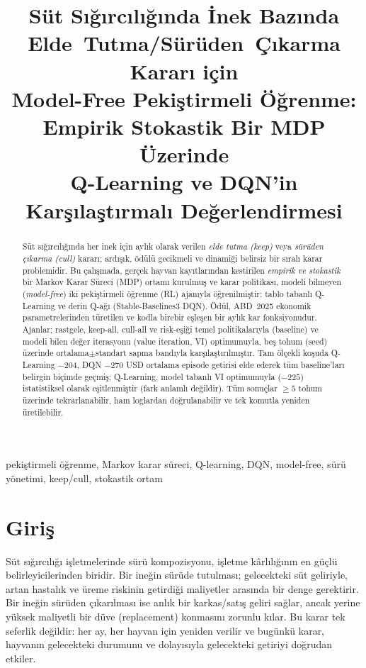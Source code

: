 \documentclass[conference]{IEEEtran}
\title{Süt Sığırcılığında İnek Bazında Elde~Tutma/Sürüden~Çıkarma Kararı için \\ Model-Free Pekiştirmeli Öğrenme: Empirik Stokastik Bir MDP Üzerinde \\ Q-Learning ve DQN'in Karşılaştırmalı Değerlendirmesi}
\author{
\IEEEauthorblockN{Artun Kara (255172008)}
\IEEEauthorblockA{Bilişim Sistemleri Mühendisliği\\ Kocaeli, Türkiye\\ artunankara@gmail.com}
}
\begin{document}
\maketitle

\begin{abstract}
Süt sığırcılığında her inek için aylık olarak verilen \emph{elde tutma (keep)} veya
\emph{sürüden çıkarma (cull)} kararı; ardışık, ödülü gecikmeli ve dinamiği belirsiz
bir sıralı karar problemidir. Bu çalışmada, gerçek hayvan kayıtlarından kestirilen
\emph{empirik ve stokastik} bir Markov Karar Süreci (MDP) ortamı kurulmuş ve karar
politikası, modeli bilmeyen (\emph{model-free}) iki pekiştirmeli öğrenme (RL) ajanıyla
öğrenilmiştir: tablo tabanlı Q-Learning ve derin Q-ağı (Stable-Baselines3 DQN). Ödül,
ABD~2025 ekonomik parametrelerinden türetilen ve kodla birebir eşleşen bir aylık kar
fonksiyonudur. Ajanlar; rastgele, keep-all, cull-all ve risk-eşiği temel
politikalarıyla (baseline) ve modeli bilen değer iterasyonu (value iteration, VI)
optimumuyla, beş tohum (seed) üzerinde ortalama$\pm$standart sapma bandıyla
karşılaştırılmıştır. Tam ölçekli koşuda Q-Learning $-204$, DQN $-270$ USD ortalama
episode getirisi elde ederek tüm baseline'ları belirgin biçimde geçmiş; Q-Learning,
model tabanlı VI optimumuyla ($-225$) istatistiksel olarak eşitlenmiştir (fark anlamlı değildir).
Tüm sonuçlar $\geq5$ tohum üzerinde tekrarlanabilir, ham loglardan doğrulanabilir ve
tek komutla yeniden üretilebilir.
\end{abstract}

\begin{IEEEkeywords}
pekiştirmeli öğrenme, Markov karar süreci, Q-learning, DQN, model-free,
sürü yönetimi, keep/cull, stokastik ortam
\end{IEEEkeywords}

\section{Giriş}
Süt sığırcılığı işletmelerinde sürü kompozisyonu, işletme kârlılığının en güçlü
belirleyicilerinden biridir. Bir ineğin sürüde tutulması; gelecekteki süt geliriyle,
artan hastalık ve üreme riskinin getirdiği maliyetler arasında bir denge gerektirir.
Bir ineğin sürüden çıkarılması ise anlık bir karkas/satış geliri sağlar, ancak yerine
yüksek maliyetli bir düve (replacement) konmasını zorunlu kılar. Bu karar tek seferlik
değildir: her ay, her hayvan için yeniden verilir ve bugünkü karar, hayvanın gelecekteki
durumunu ve dolayısıyla gelecekteki getiriyi doğrudan etkiler.
\end{document}
